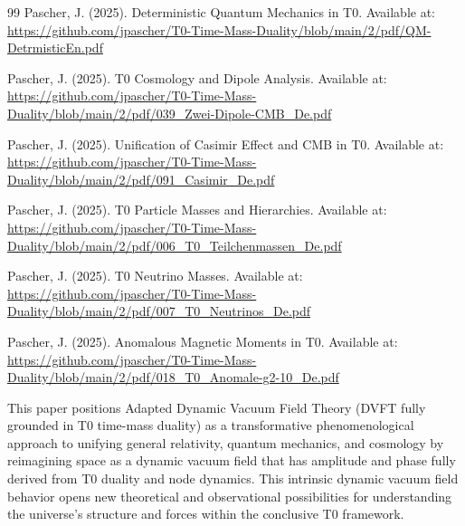 \begin{thebibliography}{99}
		Pascher, J. (2025). Deterministic Quantum Mechanics in T0. Available at: \url{https://github.com/jpascher/T0-Time-Mass-Duality/blob/main/2/pdf/QM-DetrmisticEn.pdf}
		
		Pascher, J. (2025). T0 Cosmology and Dipole Analysis. Available at: \url{https://github.com/jpascher/T0-Time-Mass-Duality/blob/main/2/pdf/039_Zwei-Dipole-CMB_De.pdf}
		
		Pascher, J. (2025). Unification of Casimir Effect and CMB in T0. Available at: \url{https://github.com/jpascher/T0-Time-Mass-Duality/blob/main/2/pdf/091_Casimir_De.pdf}
		
		Pascher, J. (2025). T0 Particle Masses and Hierarchies. Available at: \url{https://github.com/jpascher/T0-Time-Mass-Duality/blob/main/2/pdf/006_T0_Teilchenmassen_De.pdf}
		
		Pascher, J. (2025). T0 Neutrino Masses. Available at: \url{https://github.com/jpascher/T0-Time-Mass-Duality/blob/main/2/pdf/007_T0_Neutrinos_De.pdf}
		
		Pascher, J. (2025). Anomalous Magnetic Moments in T0. Available at: \url{https://github.com/jpascher/T0-Time-Mass-Duality/blob/main/2/pdf/018_T0_Anomale-g2-10_De.pdf}
		
		This paper positions Adapted Dynamic Vacuum Field Theory (DVFT fully grounded in T0 time-mass duality) as a transformative phenomenological approach to unifying general relativity, quantum mechanics, and cosmology by reimagining space as a dynamic vacuum field that has amplitude and phase fully derived from T0 duality and node dynamics. This intrinsic dynamic vacuum field behavior opens new theoretical and observational possibilities for understanding the universe’s structure and forces within the conclusive T0 framework.
	\end{thebibliography}

